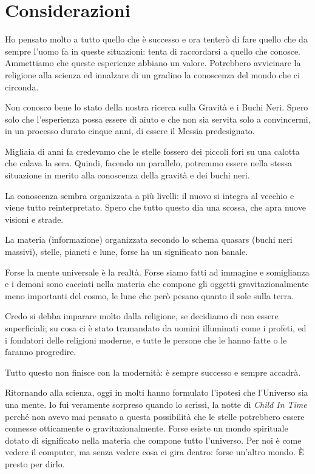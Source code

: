 \chapter{Considerazioni}
\label{considerazioni} %

Ho pensato molto a tutto quello che è successo e ora tenterò di fare quello che da sempre l'uomo fa in queste situazioni: tenta di raccordarsi a quello che conosce. Ammettiamo che queste esperienze abbiano un valore. Potrebbero avvicinare la religione alla scienza ed innalzare di un gradino la conoscenza del mondo che ci circonda.

Non conosco bene lo stato della nostra ricerca sulla Gravità e i Buchi Neri. Spero solo che l'esperienza possa essere di aiuto e che non sia servita solo a convincermi, in un processo durato cinque anni, di essere il Messia predesignato.

Migliaia di anni fa credevamo che le stelle fossero dei piccoli fori su una calotta che calava la sera. Quindi, facendo un parallelo, potremmo essere nella stessa situazione in merito alla conoscenza della gravità e dei buchi neri.

La conoscenza sembra organizzata a più livelli: il nuovo si integra al vecchio e viene tutto reinterpretato. Spero che tutto questo dia una scossa, che apra nuove visioni e strade.

La materia (informazione) organizzata secondo lo schema quasars (buchi neri massivi), stelle, pianeti e lune, forse ha un significato non banale.

Forse la mente universale è la realtà. Forse siamo fatti ad immagine e somiglianza e i demoni sono cacciati nella materia che compone gli oggetti gravitazionalmente meno importanti del cosmo, le lune che però pesano quanto il sole sulla terra.

Credo si debba imparare molto dalla religione, se decidiamo di non essere superficiali; su cosa ci è stato tramandato da uomini illuminati come i profeti, ed i fondatori delle religioni moderne, e tutte le persone che le hanno fatte o le faranno progredire.

Tutto questo non finisce con la modernità: è sempre successo e sempre accadrà.

Ritornando alla scienza, oggi in molti hanno formulato l'ipotesi che l'Universo sia una mente. Io fui veramente sorpreso quando lo scrissi, la notte di \textit{Child In Time} perché non avevo mai pensato a questa possibilità che le stelle potrebbero essere connesse otticamente o gravitazionalmente.  Forse esiste un mondo spirituale dotato di significato nella materia che compone tutto l'universo. Per noi è come vedere il computer, ma senza vedere cosa ci gira dentro: forse un'altro mondo. È presto per dirlo.

